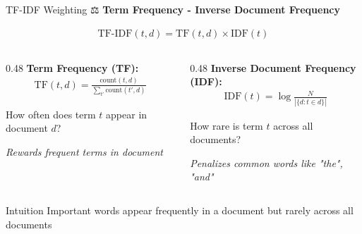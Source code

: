 \documentclass[aspectratio=169]{beamer}
\begin{document}
\begin{frame}{TF-IDF Weighting ⚖️}
\textbf{Term Frequency - Inverse Document Frequency}

\vspace{1em}

\begin{align*}
\text{TF-IDF}(t,d) = \text{TF}(t,d) \times \text{IDF}(t)
\end{align*}

\vspace{0.5em}

\begin{columns}[T]
\begin{column}{0.48\textwidth}
\textbf{Term Frequency (TF):}
\begin{align*}
\text{TF}(t,d) = \frac{\text{count}(t,d)}{\sum_{t'} \text{count}(t',d)}
\end{align*}

How often does term $t$ appear in document $d$?

\vspace{0.5em}
\textit{Rewards frequent terms in document}
\end{column}

\begin{column}{0.48\textwidth}
\textbf{Inverse Document Frequency (IDF):}
\begin{align*}
\text{IDF}(t) = \log \frac{N}{|\{d : t \in d\}|}
\end{align*}

How rare is term $t$ across all documents?

\vspace{0.5em}
\textit{Penalizes common words like "the", "and"}
\end{column}
\end{columns}

\vspace{1em}

\begin{exampleblock}{Intuition}
Important words appear frequently in a document but rarely across all documents
\end{exampleblock}
\end{frame}
\end{document}
